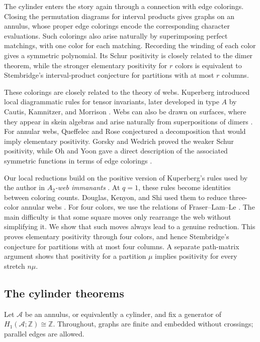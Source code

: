 \documentclass[11pt]{article}
\theoremstyle{definition}
\theoremstyle{remark}
\newcommand{\cyl}{\mathcal A}
\begin{document}
The cylinder enters the story again through a
connection with edge colorings. Closing the
permutation diagrams for interval products gives
graphs on an annulus, whose proper edge colorings
encode the corresponding character evaluations.
Such colorings also arise naturally by superimposing
perfect matchings, with one color for each matching.
Recording the winding of each color gives a
symmetric polynomial. Its Schur positivity is
closely related to the dimer theorem, while the
stronger elementary positivity for $r$ colors
is equivalent to Stembridge's interval-product
conjecture for partitions with at most $r$ columns.



These colorings are closely related to the theory
of webs. Kuperberg introduced local diagrammatic
rules for tensor invariants, later developed in
type $A$ by Cautis, Kamnitzer, and Morrison
\cite{Kuperberg,CKM}. Webs can also be drawn on
surfaces, where they appear in skein algebras
and arise naturally from superpositions of dimers
\cite{FrohmanSikora,FLL,DKS}. For annular webs,
Queffelec and Rose conjectured a decomposition
that would imply elementary positivity.
Gorsky and Wedrich proved the weaker Schur
positivity, while Oh and Yoon gave a direct
description of the associated symmetric functions
in terms of edge colorings \cite{QR,GW,OY}.



Our local reductions build on the positive version
of Kuperberg's rules used by the author in
\emph{$A_2$-web immanants} \cite{PWeb}.
At $q=1$, these rules become identities between
coloring counts. Douglas, Kenyon, and Shi used
them to reduce three-color annular webs
\cite[Proposition~6.1]{DKS}.
For four colors, we use the relations of
Fraser--Lam--Le \cite{FLL}. The main difficulty
is that some square moves only rearrange the
web without simplifying it. We show that such
moves always lead to a genuine reduction.
This proves elementary positivity through four
colors, and hence Stembridge's conjecture for
partitions with at most four columns.
A separate path-matrix argument shows that
positivity for a partition $\mu$ implies
positivity for every stretch $n\mu$.



\subsection{The cylinder theorems}

Let $\cyl$ be an annulus, or equivalently a cylinder, and
fix a generator of $H_1(\cyl;\mathbb Z)\cong\mathbb Z$.
Throughout, graphs are finite and embedded without
crossings; parallel edges are allowed.
\end{document}
